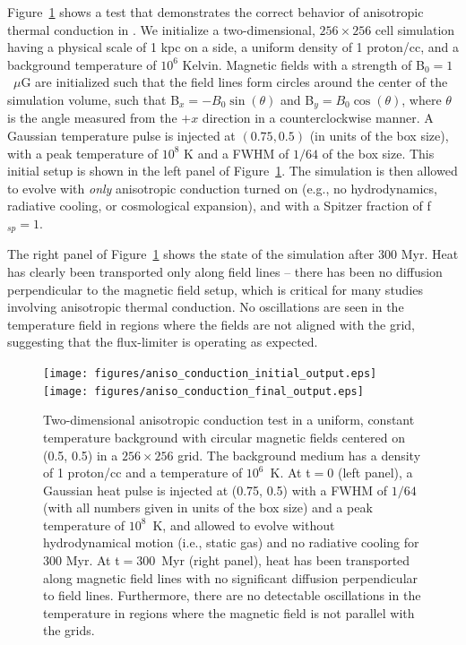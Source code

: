 Figure~\ref{fig.conduct} shows a test that demonstrates the correct
behavior of anisotropic thermal conduction in \enzo.  We initialize a
two-dimensional, $256 \times 256$ cell simulation having a physical
scale of 1 kpc on a side, a uniform density of 1 proton/cc, and a
background temperature of $10^6$ Kelvin.  Magnetic fields with a
strength of B$_0 = 1$~$\mu$G are initialized such that the field lines
form circles around the center of the simulation volume, such that
B$_x = -B_0\sin(\theta)$ and B$_y = B_0\cos(\theta)$, where $\theta$
is the angle measured from the $+x$ direction in a counterclockwise
manner.  A Gaussian temperature pulse is injected at $(0.75, 0.5)$ (in
units of the box size), with a peak temperature of $10^8$ K and a FWHM
of $1/64$ of the box size.  This initial setup is shown in the left
panel of Figure~\ref{fig.conduct}.  The simulation is then allowed to
evolve with \textit{only} anisotropic conduction turned on (e.g., no
hydrodynamics, radiative cooling, or cosmological expansion), and with
a Spitzer fraction of f$_{sp} = 1$.

The right panel of Figure~\ref{fig.conduct} shows the state of the
simulation after 300 Myr.  Heat has clearly been transported only along
field lines -- there has been no diffusion perpendicular to the
magnetic field setup, which is critical for many studies involving
anisotropic thermal conduction.  No oscillations are seen in the
temperature field in regions where the fields are not aligned with the
grid, suggesting that the flux-limiter is operating as expected.

\begin{figure}
\begin{center}
\texttt{[image: figures/aniso\_conduction\_initial\_output.eps]}
\texttt{[image: figures/aniso\_conduction\_final\_output.eps]}
\caption{Two-dimensional anisotropic conduction test in a uniform,
constant temperature background with circular magnetic fields centered
on (0.5, 0.5) in a $256 \times 256$ grid.  The background medium has a
density of 1 proton/cc and a temperature of $10^6$~K.  At t$ = 0$
(left panel), a Gaussian heat pulse is injected at (0.75, 0.5) with a
FWHM of $1/64$ (with all numbers given in units of the box size) and a
peak temperature of $10^8$~K, and allowed to evolve without
hydrodynamical motion (i.e., static gas) and no radiative cooling for
300 Myr.  At t$ = 300$~Myr (right panel), heat has been transported
along magnetic field lines with no significant diffusion perpendicular
to field lines. Furthermore, there are no detectable oscillations in
the temperature in regions where the magnetic field is not parallel
with the grids.}
\label{fig.conduct}
\end{center}
\end{figure}


